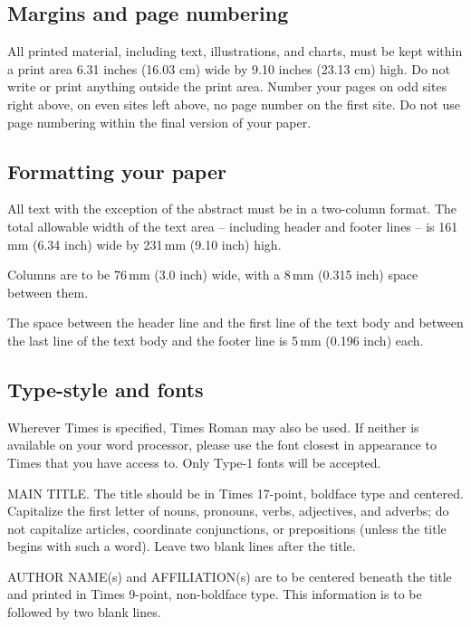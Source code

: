 \documentclass{egpubl-eurovis-short}
\begin{document}
\subsection{Margins and page numbering}

All printed material, including text, illustrations, and charts,
must be kept within a print area 6.31 inches (16.03 cm) wide by
9.10 inches (23.13 cm) high. Do not write or print anything
outside the print area. Number your pages on odd sites right
above, on even sites left above, no page number on the first site.
Do not use page numbering within the final version of your paper.

\subsection{Formatting your paper}

All text with the exception of the abstract must be in a two-column format.
The total allowable width of the text area -- including header and footer
lines -- is 161\,mm (6.34 inch) wide by 231\,mm (9.10 inch) high.

Columns are to be 76\,mm (3.0 inch) wide, with a 8\,mm (0.315 inch) space 
between them.

The space between the header line and the first line of the text body and
between the last line of the text body and the footer line is 5\,mm
(0.196 inch) each.

\subsection{Type-style and fonts}

Wherever Times is specified, Times Roman may also be used. If
neither is available on your word processor, please use the font
closest in appearance to Times that you have access to. Only
Type-1 fonts will be accepted.

MAIN TITLE. The title should be in Times 17-point, boldface type and
centered. Capitalize the first letter of nouns, pronouns, verbs, adjectives,
and adverbs; do not capitalize articles, coordinate conjunctions, or
prepositions (unless the title begins with such a word). Leave two blank
lines after the title.

AUTHOR NAME(s) and AFFILIATION(s) are to be centered beneath the title and
printed in Times 9-point, non-boldface type. This information is to be
followed by two blank lines.
\end{document}

